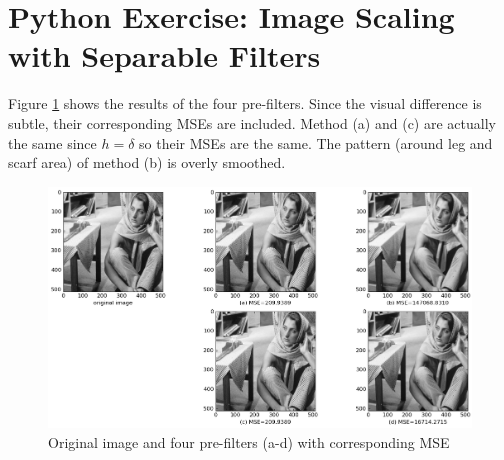 \section{Python Exercise: Image Scaling with Separable Filters}\label{sec:p7}

Figure \ref{fig:p7} shows the results of the four pre-filters. Since the visual difference is subtle, their corresponding MSEs are included. Method (a) and (c) are actually the same since $h = \delta$ so their MSEs are the same. The pattern (around leg and scarf area) of method (b) is overly smoothed.

\begin{figure}[htbp]
	\centering
	\includegraphics[width=\textwidth]{images/p7}
	\caption{Original image and four pre-filters (a-d) with corresponding MSE}
	\label{fig:p7}
\end{figure}